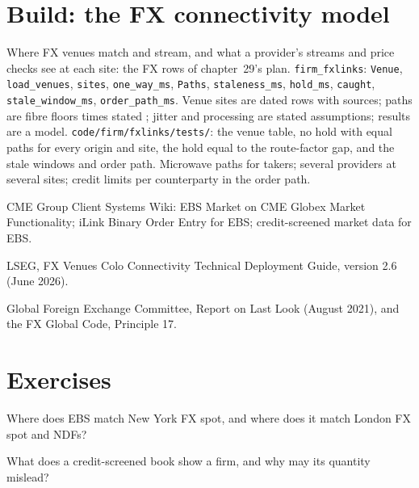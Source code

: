\section{Build: the FX connectivity model}\label{bld:nw:fx-connectivity:fxlinks}

\begin{build}
 Where FX venues match and stream, and what a provider's streams and price checks see at each site: the FX rows of
chapter~29's plan.
 \texttt{firm\_fxlinks}: \texttt{Venue}, \texttt{load\_venues}, \texttt{sites}, \texttt{one\_way\_ms},
\texttt{Paths}, \texttt{staleness\_ms}, \texttt{hold\_ms}, \texttt{caught}, \texttt{stale\_window\_ms}, \texttt{order\_path\_ms}.
 Venue sites are dated rows with sources; paths are fibre floors times stated ; jitter and processing are
stated assumptions; results are a model.
 \texttt{code/firm/fxlinks/tests/}: the venue table, no hold with equal paths for every origin and site, the
hold equal to the route-factor gap, and the stale windows and order path.
 Microwave paths for takers; several providers at several sites; credit limits per counterparty in the order path.
\end{build}

\begin{omsources}
\item CME Group Client Systems Wiki: EBS Market on CME Globex Market Functionality; iLink Binary Order Entry for EBS; credit-screened
  market data for EBS.
\item LSEG, FX Venues Colo Connectivity Technical Deployment Guide, version 2.6 (June 2026).
\item Global Foreign Exchange Committee, Report on Last Look (August 2021), and the FX Global Code, Principle 17.
\end{omsources}

\section{Exercises}

\begin{exercise}[$\star$]\label{exo:nw:fx-connectivity:1}
Where does EBS match New York FX spot, and where does it match London FX spot and NDFs?
\end{exercise}

\begin{exercise}[$\star$]\label{exo:nw:fx-connectivity:2}
What does a credit-screened book show a firm, and why may its quantity mislead?
\end{exercise}

